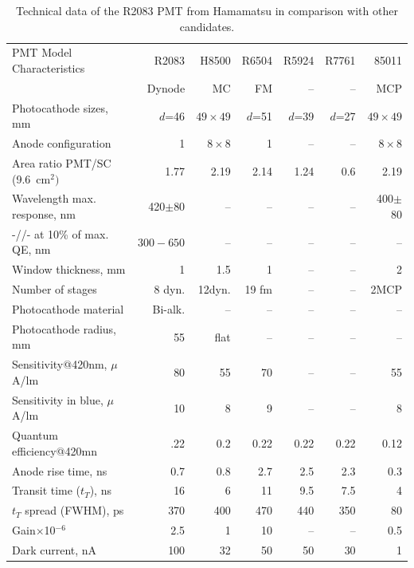 \begin{table}[htbp]
\begin{center}
\begin{tabular}{|l|r|r|r|r|r|r|}   \hline
PMT Model Characteristics       & R2083      &  H8500     & R6504 & R5924  & R7761   & 85011        \\ 
                                & Dynode     &   MC       & FM    &  --    &   --    &  MCP         \\ \hline  
Photocathode sizes, mm         & $d$=46     &$49\times49$& $d$=51& $d$=39 & $d$=27  & $49\times49$ \\ \hline
Anode configuration             & 1          & $8\times8$ &   1   &  --    &   --    & $8\times8$   \\ \hline
Area ratio PMT/SC (9.6~cm$^2)$  & 1.77       &  2.19      & 2.14  & 1.24   & 0.6     & 2.19         \\ \hline
Wavelength max. response, nm    & 420$\pm$80 &    --      & --    & --     & --      & 400$\pm$80   \\ \hline
-//-  at 10\% of max. QE, nm    & $300-650$  &    --      & --    &  --    & --      & --           \\ \hline
Window thickness, mm            &  1         &    1.5     &  1    &   --   &  --     &  2           \\ \hline
Number of stages                & 8 dyn.     &  12dyn.    & 19 fm &   --   &  --     & 2MCP         \\ \hline
Photocathode material          & Bi-alk.    &    --      &  --   &   --   &  --     & --           \\ \hline
Photocathode radius, mm        & 55         &   flat     &  --   &   --   &  --     & --           \\ \hline
Sensitivity@420nm, $\mu$A/lm    & 80         &   55       &  70   &   --   &  --     & 55           \\ \hline
Sensitivity in blue, $\mu$A/lm  & 10         &   8        &  9    &  --    &  --     & 8            \\ \hline
Quantum efficiency@420mn        & .22        &   0.2      &  0.22 &  0.22  & 0.22    & 0.12         \\ \hline
Anode rise time, ns             & 0.7        &   0.8      &  2.7  & 2.5    & 2.3     & 0.3          \\ \hline
Transit time ($t_T$), ns        & 16         &   6        &  11   & 9.5    &  7.5    & 4            \\ \hline
$t_T$ spread (FWHM), ps         & 370        &   400      & 470   &  440   &  350    & 80           \\ \hline
Gain$\times$10$^{-6}$           & 2.5        &   1        &  10   &   --   &   --    & 0.5          \\ \hline
Dark current, nA                & 100        &    32      &    50 &   50   &  30     & 1            \\ \hline
\end{tabular}
\end{center}
\caption{\small{Technical data of the R2083 PMT from Hamamatsu in comparison with 
other candidates.}}
\label{table1PMTS}
\end{table}
